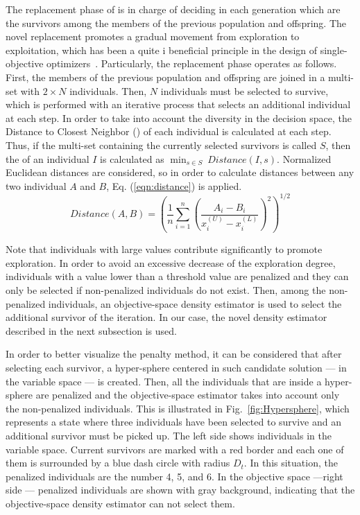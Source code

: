 The replacement phase of \EAS{} is in charge of deciding in each generation which are the survivors 
among the members of the previous population and offspring.
%
The novel replacement promotes a gradual movement from exploration to exploitation, which has been a quite i
beneficial principle in the design of single-objective optimizers~\cite{Joel:MULTI_DYNAMIC}.
%
Particularly, the replacement phase operates as follows.
%
First, the members of the previous population and offspring are joined in a multi-set with $2 \times N$ individuals.
%
Then, $N$ individuals must be selected to survive, which is performed with an iterative process that selects an additional
individual at each step.
%
In order to take into account the diversity in the decision space, the Distance to Closest Neighbor (\DCN{}) of each
individual is calculated at each step.
%
Thus, if the multi-set containing the currently selected survivors is called $S$, then the \DCN{} of an individual $I$ is calculated
as $\displaystyle{\min_{s \in S}\ Distance(I, s)}$.
%
Normalized Euclidean distances are considered, so in order to calculate distances between any two individual $A$ and $B$, 
Eq. (\ref{eqn:distance}) is applied.
%
\begin{equation}\label{eqn:distance}
Distance(A, B) =   \left ( \frac{1}{n}  \sum_{i=1}^n \left ( \frac{A_i - B_i}{x_i^{(U)} - x_i^{(L)}} \right )^2  \right)^{1/2}
\end{equation}

Note that individuals with large \DCN{} values contribute significantly to promote exploration.
%
In order to avoid an excessive decrease of the exploration degree, individuals with a \DCN{} value lower 
than a threshold value are penalized and they can only be selected if non-penalized individuals do not exist.
%
Then, among the non-penalized individuals, an objective-space density estimator is used to select the additional
survivor of the iteration.
%
In our case, the novel density estimator described in the next subsection is used. 

In order to better visualize the penalty method, it can be considered that after selecting each survivor, a hyper-sphere 
centered in such candidate solution --- in the variable space --- is created.
%
Then, all the individuals that are inside a hyper-sphere are penalized and the objective-space estimator takes 
into account only the non-penalized individuals.
%
This is illustrated in Fig.~\ref{fig:Hypersphere}, which represents a state where three individuals have been 
selected to survive and an additional survivor must be picked up.
%
The left side shows individuals in the variable space.
%
Current survivors are marked with a red border and each one of them is surrounded by a blue dash circle with 
radius $D_t$.
%
In this situation, the penalized individuals are the number 4, 5, and 6.
%
In the objective space ---right side --- penalized individuals are shown with gray background, indicating
that the objective-space density estimator can not select them.

